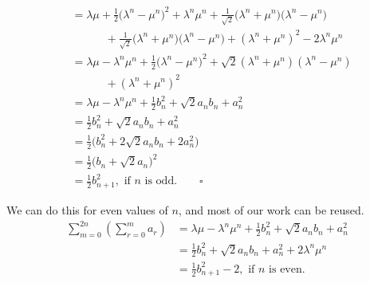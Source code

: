 \documentclass[12pt]{article}
\begin{document}
\begin{align*}
                                                    & = \lambda\mu + \frac{1}{2} \bigg(\lambda^n - \mu^n \bigg)^2 + \lambda^n\mu^n + \frac{1}{\sqrt{2}} \bigg(\lambda^n + \mu^n \bigg) \bigg(\lambda^n - \mu^n \bigg)                                \\
                                                    & \phantom{++}\quad + \frac{1}{\sqrt{2}} \bigg(\lambda^n + \mu^n \bigg) \bigg(\lambda^n - \mu^n \bigg) + (\lambda^n + \mu^n)^2 - 2\lambda^n\mu^n                                                 \\
                                                    & = \lambda\mu - \lambda^n\mu^n + \frac{1}{2} \bigg(\lambda^n - \mu^n \bigg)^2 + \sqrt{2} (\lambda^n + \mu^n)(\lambda^n - \mu^n)                                                                 \\
                                                    & \phantom{++}\quad + (\lambda^n + \mu^n)^2                                                                                                                                                      \\
                                                    & = \lambda\mu - \lambda^n\mu^n + \frac{1}{2} b^2_n + \sqrt{2} a_n b_n + a^2_n                                                                                                                   \\
                                                    & = \frac{1}{2} b^2_n + \sqrt{2} a_n b_n + a^2_n                                                                                                                                                 \\
                                                    & = \frac{1}{2} \bigg(b^2_n + 2\sqrt{2} a_n b_n + 2a^2_n \bigg)                                                                                                                                  \\
                                                    & = \frac{1}{2} \bigg(b_n + \sqrt{2} a_n \bigg)^2                                                                                                                                                \\
                                                    & = \frac{1}{2} b^2_{n+1}, \text{ if $n$ is odd}. \qquad \square
\end{align*}

We can do this for even values of $n$, and most of our work can be reused.
\begin{align*}
    \sum_{m=0}^{2n} \left(\sum_{r=0}^{m} a_r\right) & = \lambda\mu - \lambda^n\mu^n + \frac{1}{2} b^2_n + \sqrt{2} a_n b_n + a^2_n \\
                                                    & = \frac{1}{2} b^2_n + \sqrt{2} a_n b_n + a^2_n + 2\lambda^n\mu^n             \\
                                                    & = \frac{1}{2} b^2_{n+1} - 2, \text{ if $n$ is even}.
\end{align*}
\end{document}
